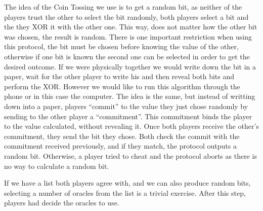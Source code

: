 The idea of the Coin Tossing we use is to get a random bit, as neither of the
  players trust the other to select the bit randomly, both players select a bit
  and the they XOR it with the other one.
This way, does not matter how the other bit was chosen, the result is random.
There is one important restriction when using this protocol, the bit must be
  chosen before knowing the value of  the other, otherwise if one bit is known
  the second one can be selected in order to get the desired outcome.
If we were physically together we would write down the bit in a paper, wait for
  the other player to write his and then reveal both bits and perform the XOR.
However we would like to run this algorithm through the phone or in this case
  the computer.
The idea is the same, but instead of writting down into a paper, players
  ``commit'' to the value they just chose randomly by sending to the other
  player a ``commitment''.
This commitment binds the player to the value calculated, without revealing it.
Once both players receive the other's commitment, they send the bit they chose.
Both check the commit with the commitment received previously, and if they
  match, the protocol outputs a random bit.
Otherwise, a player tried to cheat and the protocol aborts as there is no way to
  calculate a random bit.

If we have a list both players agree with, and we can also produce random bits,
  selecting a number of oracles from the list is a trivial exercise.
After this step, players had decide the oracles to use.
